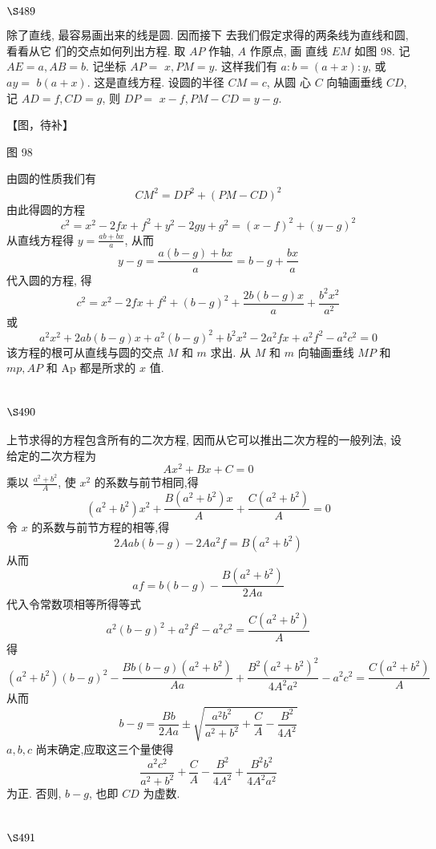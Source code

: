 $\S 489$

除了直线, 最容易画出来的线是圆. 因而接下 去我们假定求得的两条线为直线和圆, 看看从它 们的交点如何列出方程. 取 $A P$ 作轴, $A$ 作原点, 画 直线 $E M$ 如图 98. 记 $A E=a, A B=b$. 记坐标 $A P=$ $x, P M=y$. 这样我们有 $a: b=(a+x): y$, 或 $a y=$ $b(a+x)$. 这是直线方程. 设圆的半径 $C M=c$, 从圆 心 $C$ 向轴画垂线 $C D$, 记 $A D=f, C D=g$, 则 $D P=$ $x-f, P M-C D=y-g$.


【图，待补】

图 98

由圆的性质我们有
\[
C M^{2}=D P^{2}+(P M-C D)^{2}
\]
由此得圆的方程
\[
c^{2}=x^{2}-2 f x+f^{2}+y^{2}-2 g y+g^{2}=(x-f)^{2}+(y-g)^{2}
\]
从直线方程得 $y=\frac{a b+b x}{a}$, 从而
\[
y-g=\frac{a(b-g)+b x}{a}=b-g+\frac{b x}{a}
\]
代入圆的方程, 得
\[
c^{2}=x^{2}-2 f x+f^{2}+(b-g)^{2}+\frac{2 b(b-g) x}{a}+\frac{b^{2} x^{2}}{a^{2}}
\]
或
\[
a^{2} x^{2}+2 a b(b-g) x+a^{2}(b-g)^{2}+b^{2} x^{2}-2 a^{2} f x+a^{2} f^{2}-a^{2} c^{2}=0
\]
该方程的根可从直线与圆的交点 $M$ 和 $m$ 求出. 从 $M$ 和 $m$ 向轴画垂线 $M P$ 和 $m p, A P$ 和 Ap 都是所求的 $x$ 值.

\section{$\S 490$}

上节求得的方程包含所有的二次方程, 因而从它可以推出二次方程的一般列法, 设 给定的二次方程为
\[
A x^{2}+B x+C=0
\]
乘以 $\frac{a^{2}+b^{2}}{A}$, 使 $x^{2}$ 的系数与前节相同,得
\[
\left(a^{2}+b^{2}\right) x^{2}+\frac{B\left(a^{2}+b^{2}\right) x}{A}+\frac{C\left(a^{2}+b^{2}\right)}{A}=0
\]
令 $x$ 的系数与前节方程的相等,得
\[
2 A a b(b-g)-2 A a^{2} f=B\left(a^{2}+b^{2}\right)
\]
从而
\[
a f=b(b-g)-\frac{B\left(a^{2}+b^{2}\right)}{2 A a}
\]
代入令常数项相等所得等式
\[
a^{2}(b-g)^{2}+a^{2} f^{2}-a^{2} c^{2}=\frac{C\left(a^{2}+b^{2}\right)}{A}
\]
得
\[
\left(a^{2}+b^{2}\right)(b-g)^{2}-\frac{B b(b-g)\left(a^{2}+b^{2}\right)}{A a}+\frac{B^{2}\left(a^{2}+b^{2}\right)^{2}}{4 A^{2} a^{2}}-a^{2} c^{2}=\frac{C\left(a^{2}+b^{2}\right)}{A}
\]
从而
\[
b-g=\frac{B b}{2 A a} \pm \sqrt{\frac{a^{2} b^{2}}{a^{2}+b^{2}}+\frac{C}{A}-\frac{B^{2}}{4 A^{2}}}
\]
$a, b, c$ 尚末确定,应取这三个量使得
\[
\frac{a^{2} c^{2}}{a^{2}+b^{2}}+\frac{C}{A}-\frac{B^{2}}{4 A^{2}}+\frac{B^{2} b^{2}}{4 A^{2} a^{2}}
\]
为正. 否则, $b-g$, 也即 $C D$ 为虚数.

\section{$\S 491$}

